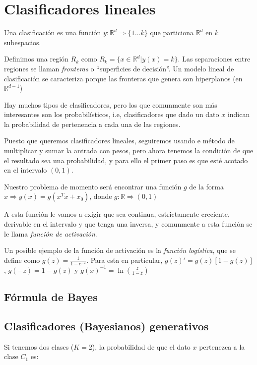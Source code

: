 \section{Clasificadores lineales}
Una clasificación es una función $y: \mathbb{R}^d \Rightarrow \{1 \dots k\}$
que particiona $\mathbb{R}^d$ en $k$ subespacios.

Definimos una región $R_k$ como $R_k = \{x \in \mathbb{R}^d | y(x) = k \}$. Las
separaciones entre regiones se llaman \textit{fronteras} o ``superficies
de decisión''. Un modelo lineal de clasificación se caracteriza porque las
fronteras que genera son hiperplanos (en $\mathbb{R}^{d - 1}$)

Hay muchos tipos de clasificadores, pero los que comunmente son más
interesantes son los probabilísticos, i.e, clasificadores que dado un
dato $x$ indican la probabilidad de pertenencia a cada una de las regiones.

Puesto que queremos clasificadores lineales, seguiremos usando e método de
multiplicar y sumar la antrada con pesos, pero ahora tenemos la condición de
que el resultado sea una probabilidad, y para ello el primer paso es que esté
acotado en el intervalo $(0,1)$.

Nuestro problema de momento será encontrar una función $g$ de la forma
$x \Rightarrow y(x) = g(x^Tx + x_0)$, donde $g: \mathbb{R} \Rightarrow (0,1)$

A esta función le vamos a exigir que sea continua, estrictamente creciente,
derivable en el intervalo y que tenga una inversa, y comunmente a esta función
se le llama \textit{función de activación}.

Un posible ejemplo de la función de activación es la \textit{función logística},
que se define como $g(z) = \frac{1}{1 - e^{-z}}$. Para esta en particular, $g(z)' = g(z) [1 - g(z)]$, $g(-z) =   1 - g(z)$ y $g(x)^{-1} = \ln(\frac{z}{1 - z})$

\subsection{Fórmula de Bayes}



\subsection{Clasificadores (Bayesianos) generativos}
Si tenemos dos clases ($K = 2$), la probabilidad de que el dato
$x$ pertenezca a la clase $C_1$ es:


